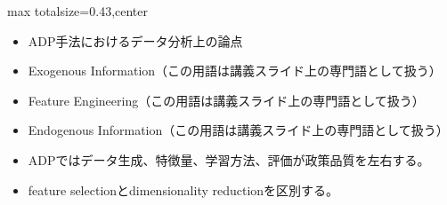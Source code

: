 \clearpage
{}
\begin{minipage}[t]{0.405\textwidth}
\begin{adjustbox}{max totalsize={\textwidth}{0.43\textheight},center}
\begin{minipage}{\textwidth}\scriptsize
{}\begin{itemize}
\item ADP手法におけるデータ分析上の論点
\item Exogenous Information（この用語は講義スライド上の専門語として扱う）
\item Feature Engineering（この用語は講義スライド上の専門語として扱う）
\item Endogenous Information（この用語は講義スライド上の専門語として扱う）
\end{itemize}\begin{itemize}
\item ADPではデータ生成、特徴量、学習方法、評価が政策品質を左右する。
\item feature selectionとdimensionality reductionを区別する。
\end{itemize}
\end{minipage}
\end{adjustbox}
\end{minipage}\hfill

